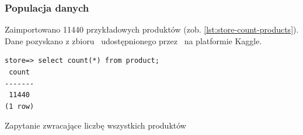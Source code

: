 \subsubsection{Populacja danych}

Zaimportowano 11440 przykładowych produktów (zob. \autoref{lst:store-count-products}).
Dane pozyskano z zbioru~\cite{fashion-dataset} udostępnionego przez~\citeauthor*{fashion-dataset} na platformie Kaggle.

\begin{listing}[H]
    \begin{verbatim}
store=> select count(*) from product;
 count
-------
 11440
(1 row)
    \end{verbatim}
    \caption{Zapytanie zwracające liczbę wszystkich produktów}
    \label{lst:store-count-products}
\end{listing}
